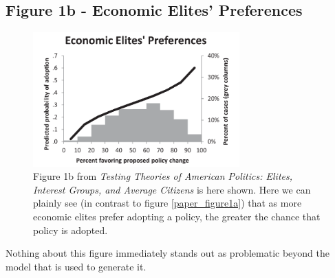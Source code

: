 \documentclass[]{article}
\begin{document}
\subsection{Figure 1b - Economic Elites' Preferences}
\label{section_figure1b}
\begin{figure}[H]
	\begin{center}
		\includegraphics[width=300px]{./figures/paper/economic-elites-preferences.png}
	\end{center}	
	\caption{Figure 1b from \textit{Testing Theories of American Politics: Elites, Interest Groups, and Average Citizens} is here shown. Here we can plainly see (in contrast to figure \ref{paper_figure1a}) that as more economic elites prefer adopting a policy, the greater the chance that policy is adopted.}
	\label{paper_figure1b}
\end{figure}

Nothing about this figure immediately stands out as problematic beyond the model that is used to generate it.
\end{document}
